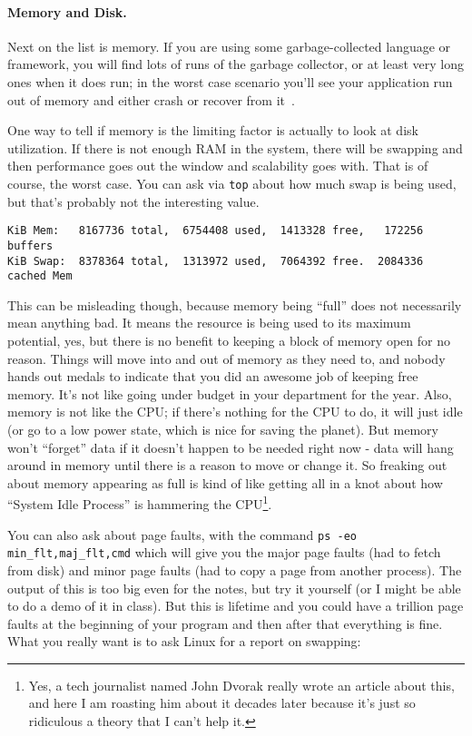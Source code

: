 \paragraph{Memory and Disk.} Next on the list is memory. If you are using some garbage-collected language or framework, you will find lots of runs of the garbage collector, or at least very long ones when it does run; in the worst case scenario you'll see your application run out of memory and either crash or recover from it~\cite{bottlenecks-android}.

One way to tell if memory is the limiting factor is actually to look at disk utilization. If there is not enough RAM in the system, there will be swapping and then performance goes out the window and scalability goes with. That is of course, the worst case. You can ask via \texttt{top} about how much swap is being used, but that's probably not the interesting value. 

\begin{verbatim}
KiB Mem:   8167736 total,  6754408 used,  1413328 free,   172256 buffers
KiB Swap:  8378364 total,  1313972 used,  7064392 free.  2084336 cached Mem
\end{verbatim}

This can be misleading though, because memory being ``full'' does not necessarily mean anything bad. It means the resource is being used to its maximum potential, yes, but there is no benefit to keeping a block of memory open for no reason. Things will move into and out of memory as they need to, and nobody hands out medals to indicate that you did an awesome job of keeping free memory. It's not like going under budget in your department for the year.  Also, memory is not like the CPU; if there's nothing for the CPU to do, it will just idle (or go to a low power state, which is nice for saving the planet). But memory won't ``forget'' data if it doesn't happen to be needed right now - data will hang around in memory until there is a reason to move or change it. So freaking out about memory appearing as full is kind of like getting all in a knot about how ``System Idle Process'' is hammering the CPU\footnote{Yes, a tech journalist named John Dvorak really wrote an article about this, and here I am roasting him about it decades later because it's just so ridiculous a theory that I can't help it.}.

You can also ask about page faults, with the command \texttt{ps -eo min\_flt,maj\_flt,cmd} which will give you the major page faults (had to fetch from disk) and minor page faults (had to copy a page from another process). The output of this is too big even for the notes, but try it yourself (or I might be able to do a demo of it in class). But this is lifetime and you could have a trillion page faults at the beginning of your program and then after that everything is fine. What you really want is to ask Linux for a report on swapping:


